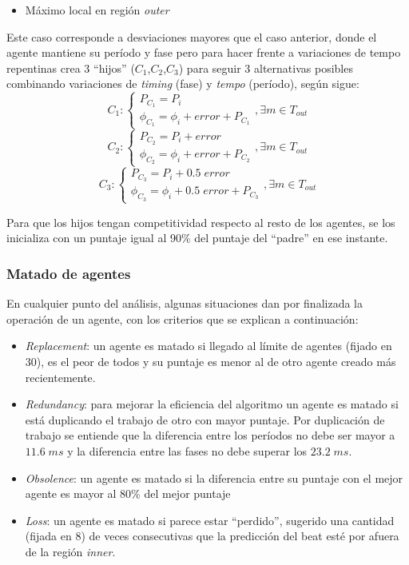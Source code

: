 \documentclass[12pt,a4paper,titlepage]{report}
\begin{document}
\begin{itemize} \item Máximo local en región \emph{outer} \end{itemize}
Este caso corresponde a desviaciones mayores que el caso anterior, donde el agente mantiene su período y fase pero para hacer frente a variaciones de tempo repentinas crea 3 ``hijos'' ($C_1$,$C_2$,$C_3$) para seguir 3 alternativas posibles combinando variaciones de \emph{timing} (fase) y \emph{tempo} (período), según sigue:\\
\footnotesize
$$
C_1:
\begin{cases}
P_{C_1}=P_i\\
\phi _{C_1}=\phi _i + error + P_{C_1}
\end{cases}
, \exists m \in T_{out}
$$
$$
C_2:
\begin{cases}
P_{C_2}=P_i+error\\
\phi _{C_2}=\phi _i + error + P_{C_2}
\end{cases}
, \exists m \in T_{out}
$$
$$
C_3:
\begin{cases}
P_{C_3}=P_i+0.5\;error\\
\phi _{C_3}=\phi _i +0.5\;error + P_{C_3}
\end{cases}
, \exists m \in T_{out}
$$

\normalsize

Para que los hijos tengan competitividad respecto al resto de los agentes, se los inicializa con un puntaje igual al 90\% del puntaje del ``padre'' en ese instante.

\subsubsection{Matado de agentes}

En cualquier punto del análisis, algunas situaciones dan por finalizada la operación de un agente, con los criterios que se explican a continuación:

\begin{itemize}
\item \emph{Replacement}: un agente es matado si llegado al límite de agentes (fijado en 30), es el peor de todos y su puntaje es menor al de otro agente creado más recientemente.
\item \emph{Redundancy}: para mejorar la eficiencia del algoritmo un agente es matado si está duplicando el trabajo de otro con mayor puntaje. Por duplicación de trabajo se entiende que la diferencia entre los períodos no debe ser mayor a $11.6\;ms$ y la diferencia entre las fases no debe superar los $23.2\;ms$.
\item \emph{Obsolence}: un agente es matado si la diferencia entre su puntaje con el mejor agente es mayor al 80\% del mejor puntaje
\item \emph{Loss}: un agente es matado si parece estar ``perdido'', sugerido una cantidad (fijada en 8) de veces consecutivas que la predicción del beat esté por afuera de la región \emph{inner}.
\end{itemize}
\end{document}
